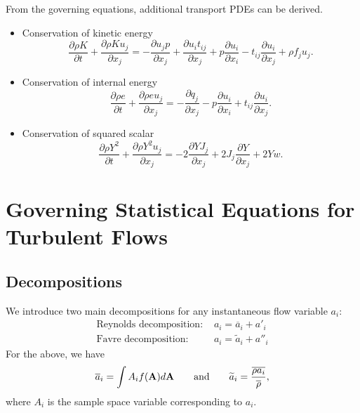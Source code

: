 \documentclass[oneside,a4paper,11pt]{report}
\newcommand{\rhoavg}{\overline{\rho}}
\newcommand{\aavg}{\overline{a}}
\newcommand{\afluc}{a'}
\newcommand{\aavgf}{\widetilde{a}}
\newcommand{\aflucf}{a''}
\begin{document}
From the governing equations, additional transport PDEs can be derived.
\begin{itemize}
\item Conservation of kinetic energy
\begin{equation}
    \label{eq:cons_kinetic_energy}
    \frac{\partial \rho K}{\partial t} + \frac{\partial \rho K u_j}{\partial x_j} = - \frac{\partial u_j p}{\partial x_j} + \frac{\partial u_i t_{ij}}{\partial x_j} + p \frac{\partial u_i}{\partial x_i} - t_{ij} \frac{\partial u_i}{\partial x_j} + \rho f_j u_j .
\end{equation}
\item Conservation of internal energy
\begin{equation}
    \label{eq:cons_internal_energy}
    \frac{ \partial \rho e}{\partial t} + \frac{\partial \rho e u_j}{\partial x_j} = -\frac{\partial q_j}{\partial x_j} - p \frac{\partial u_i}{\partial x_i} + t_{ij} \frac{\partial u_i}{\partial x_j}.
\end{equation}
\item Conservation of squared scalar
\begin{equation}
    \label{eq:cons_squared_scalar}
    \frac{\partial \rho Y^2}{\partial t} + \frac{\partial \rho Y^2 u_j}{\partial x_j} = -2\frac{\partial Y J_j}{\partial x_j} + 2J_j \frac{\partial Y}{\partial x_j} + 2 Y w.
\end{equation}
\end{itemize}

%
\chapter{Governing Statistical Equations for Turbulent Flows}
%

\section{Decompositions}

We introduce two main decompositions for any instantaneous flow variable  $a_i$:
\begin{align}
\text{Reynolds decomposition: } & a_i = \aavg_i + \afluc_i \\
\text{Favre decomposition: } & a_i = \aavgf_i + \aflucf_i
\end{align}
For the above, we have
\begin{equation} 
\aavg_i = \int A_i f(\Avec) d\Avec \qquad \text{and} \qquad \aavgf_i = \frac{\overline{ \rho a_i }}{\rhoavg},
\end{equation}
where $A_i$ is the sample space variable corresponding to $a_i$.
\end{document}
